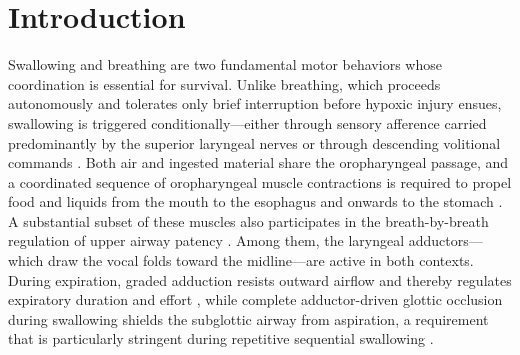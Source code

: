 \documentclass[pdflatex,sn-mathphys-ay]{sn-jnl}%
\theoremstyle{thmstyleone}%
\theoremstyle{thmstyletwo}%
\theoremstyle{thmstylethree}%
\begin{document}
\section{Introduction}\label{sec: introduction}
Swallowing and breathing are two fundamental motor behaviors whose coordination is essential for survival. Unlike breathing, which proceeds autonomously and tolerates only brief interruption before hypoxic injury ensues, swallowing is triggered conditionally---either through sensory afference carried predominantly by the superior laryngeal nerves \citep{miller1974anatomical, jafari2003sensory, hashimoto2019activity, sang2001swallowing} or through descending volitional commands \citep{mosier2001parallel,ludlow2015central, wei2024cortical, trevizan2024neuroanatomical}. Both air and ingested material share the oropharyngeal passage, and a coordinated sequence of oropharyngeal muscle contractions is required to propel food and liquids from the mouth to the esophagus and onwards to the stomach \citep{miller1986neurophysiological, sejdic2018computational, allen2012deglutition, jean2001brain}. A substantial subset of these muscles also participates in the breath-by-breath regulation of upper airway patency \citep{bartlett1989respiratory, dutschmann2002glycinergic, dutschmann2014physiological, bolser2013central, bautista2014generation}. Among them, the laryngeal adductors---which draw the vocal folds toward the midline---are active in both contexts. During expiration, graded adduction resists outward airflow and thereby regulates expiratory duration and effort \citep{harding1984perinatal, bartlett2011upper, dutschmann2002influence, dutschmann2002glycinergic, dutschmann2006kolliker, dutschmann2014physiological}, while complete adductor-driven glottic occlusion during swallowing shields the subglottic airway from aspiration, a requirement that is particularly stringent during repetitive sequential swallowing \citep{bolser2006neurogenesis,bolser2015role, dutschmann2014physiological}. 
\end{document}
